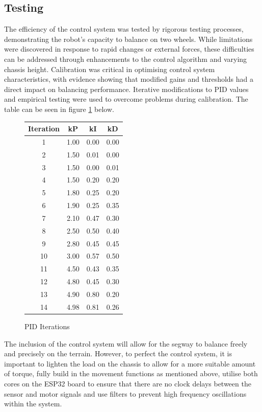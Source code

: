 \subsection{Testing}

The efficiency of the control system was tested by rigorous testing processes, demonstrating the robot's capacity to balance on two wheels. While limitations were discovered in response to rapid changes or external forces, these difficulties can be addressed through enhancements to the control algorithm and varying chassis height. Calibration was critical in optimising control system characteristics, with evidence showing that modified gains and thresholds had a direct impact on balancing performance. Iterative modifications to PID values and empirical testing were used to overcome problems during calibration. The table can be seen in figure \ref{tbl:pid-iterations} below.
\begin{figure}
    \centering
    \begin{tabular}{ |c|c|c|c|}
        \hline
            \textbf{Iteration}   &   \textbf{kP}  &   \textbf{kI}  &   \textbf{kD}  \\
            \hline
            1	&   1.00	&   0.00    &   0.00 \\
            \hline
            2	&   1.50	&   0.01    &   0.00 \\
            \hline
            3	&   1.50	&   0.00    &   0.01 \\
            \hline
            4	&   1.50	&   0.20    &   0.20 \\
            \hline
            5	&   1.80	&   0.25    &   0.20 \\
            \hline
            6	&   1.90	&   0.25    &   0.35 \\
            \hline
            7	&   2.10	&   0.47    &   0.30 \\
            \hline
            8	&   2.50	&   0.50    &   0.40 \\
            \hline
            9   &   2.80	&   0.45    &   0.45 \\
            \hline
            10  &	3.00    &   0.57    &   0.50 \\
            \hline
            11  &	4.50    &   0.43    &   0.35 \\
            \hline
            12  &	4.80    &   0.45    &   0.30 \\
            \hline
            13  &	4.90    &   0.80    &   0.20 \\
            \hline
            14  &	4.98    &   0.81    &   0.26 \\
            \hline
        \end{tabular}
    \caption{PID Iterations}
\label{tbl:pid-iterations}
\end{figure}
The inclusion of the control system will allow for the segway to balance freely and precisely on the terrain. However, to perfect the control system, it is important to lighten the load on the chassis to allow for a more suitable amount of torque, fully build in the movement functions as mentioned above, utilise both cores on the ESP32 board to ensure that there are no clock delays between the sensor and motor signals and use filters to prevent high frequency oscillations within the system.
